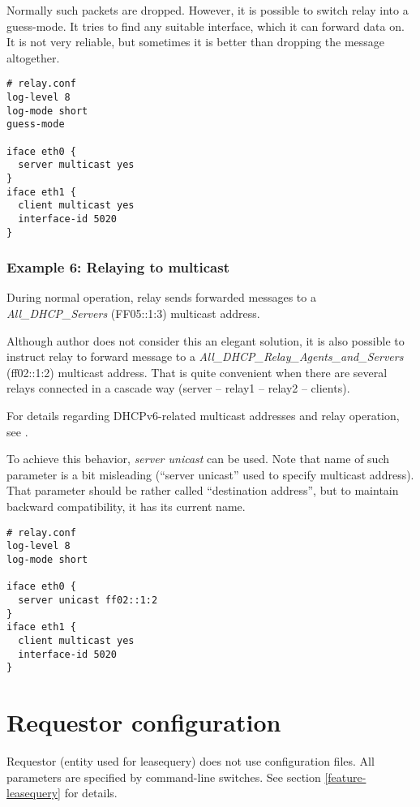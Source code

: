 Normally such packets are dropped. However, it is possible to switch
relay into a guess-mode. It tries to find any suitable interface,
which it can forward data on. It is not very reliable, but sometimes
it is better than dropping the message altogether.

\begin{lstlisting}
# relay.conf
log-level 8
log-mode short
guess-mode

iface eth0 {
  server multicast yes
}
iface eth1 {
  client multicast yes
  interface-id 5020
}
\end{lstlisting}

\subsubsection{Example 6: Relaying to multicast}
During normal operation, relay sends forwarded messages to a
\emph{All\_DHCP\_Servers} (FF05::1:3) multicast address.

Although author does not consider this an elegant solution, it is also
possible to instruct relay to forward message to a \emph{All\_DHCP\_Relay\_Agents\_and\_Servers}
(ff02::1:2) multicast address. That is quite convenient when there are several
relays connected in a cascade way (server -- relay1 -- relay2 -- clients).

For details regarding DHCPv6-related multicast addresses and relay operation, see \cite{rfc3315}.

To achieve this behavior, \emph{server unicast} can be used. Note that
name of such parameter is a bit misleading (``server unicast'' used to specify
multicast address). That parameter should be rather called ``destination address'',
but to maintain backward compatibility, it has its current name.

\begin{lstlisting}
# relay.conf
log-level 8
log-mode short

iface eth0 {
  server unicast ff02::1:2
}
iface eth1 {
  client multicast yes
  interface-id 5020
}
\end{lstlisting}

\newpage
\section{Requestor configuration}
Requestor (entity used for leasequery) does not use configuration
files. All parameters are specified by command-line switches. See
section \ref{feature-leasequery} for details.
